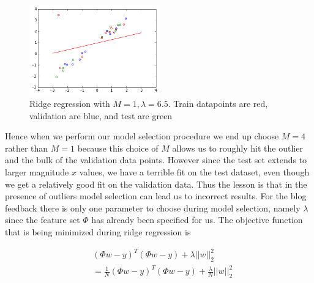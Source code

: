 \documentclass{article}
\begin{document}
\begin{figure}[h]
\centering
\includegraphics[width=0.5\textwidth]{m-1-model-selection}
\caption{Ridge regression with $M = 1, \lambda = 6.5$. Train datapoints are red, validation are blue, and test are green}
\label{m-1-model-selection}
\end{figure}
%
%
%
Hence when we perform our model selection procedure we end up choose $M = 4$ rather than $M = 1$ because this choice of $M$ allows us to roughly hit the outlier and the bulk of the validation data points. However since the test set extends to larger magnitude $x$ values, we have a terrible fit on the test dataset, even though we get a relatively good fit on the validation data. Thus the lesson is that in the presence of outliers model selection can lead us to incorrect results.
%
%
For the blog feedback there is only one parameter to choose during model selection, namely $\lambda$ since the feature set $\Phi$ has already been specified for us. The objective function that is being minimized during ridge regression is

\begin{align*}
&(\Phi w - y)^T(\Phi w - y) + \lambda ||w||_2^2\\
& = \frac{1}{N}(\Phi w - y)^T(\Phi w - y) + \frac{\lambda}{N} ||w||_2^2
\end{align*}
\end{document}
